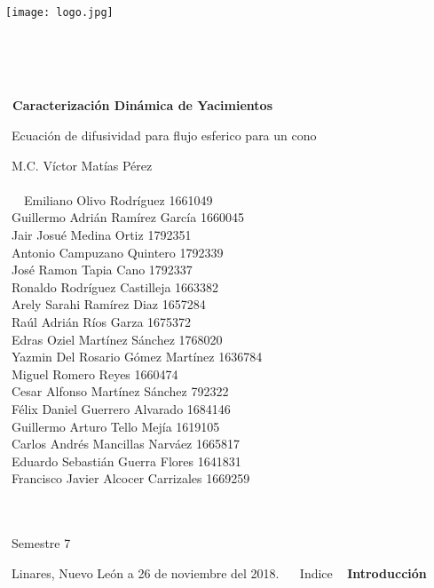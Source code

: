\documentclass[10pt,a4paper]{report}
\begin{document}
\newpage
\begin{center}
\texttt{[image: logo.jpg]}
\end{center}
\
\\
\\\
\begin{center}
{\Large{\textbf{\ Caracterización Dinámica de Yacimientos}}}
\end{center}
\bigskip
\large
\begin{center}
\ Ecuación de difusividad para flujo esferico para un cono
\end{center}
\bigskip
\ M.C. Víctor Matías Pérez
\\
\\\
\
\ Emiliano Olivo Rodríguez                  1661049
\\
\ Guillermo Adrián Ramírez García      1660045
\\
\ Jair Josué Medina Ortiz    1792351
\\
\ Antonio Campuzano Quintero             1792339
\\
\ José Ramon Tapia Cano                     1792337
\\
\ Ronaldo Rodríguez Castilleja              1663382
\\
\ Arely Sarahi Ramírez Diaz                  1657284
\\
\ Raúl Adrián Ríos Garza                       1675372
\\
\ Edras Oziel Martínez Sánchez             1768020
\\
\ Yazmin Del Rosario Gómez Martínez  1636784
\\
\ Miguel Romero Reyes  1660474
\\
\ Cesar Alfonso Martínez Sánchez    792322
\\
\ Félix Daniel Guerrero Alvarado            1684146
\\
\ Guillermo Arturo Tello Mejía                 1619105
\\
\ Carlos Andrés Mancillas Narváez         1665817
\\
\ Eduardo Sebastián Guerra Flores        1641831
\\
\ Francisco Javier Alcocer Carrizales 1669259
\\
\\\
\begin{center}
\ Semestre 7
\end{center}
\bigskip
\ Linares, Nuevo León a 26 de noviembre del 2018.
\
\newpage
\ Indice
\
\newpage
\textbf{Introducción}
\end{document}
